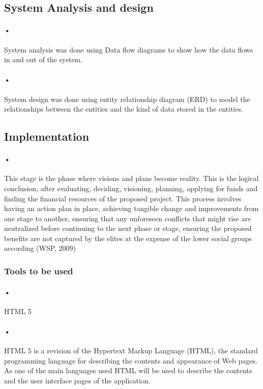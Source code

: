\documentclass[12pt]{article}
\begin{document}
\subsection{System Analysis and design}  
\paragraph{•}System analysis was done using Data flow diagrams to show how the data flows in and out of the system.
\paragraph{•}System design was done using entity relationship diagram (ERD) to model the relationships between the entities and the kind of data stored in the entities. 

\subsection{Implementation}
\paragraph{•}This stage is the phase where visions and plans become reality. This is the logical conclusion, after evaluating, deciding, visioning, planning, applying for funds and finding the financial resources of the proposed project. This process involves having an action plan in place, achieving tangible change and improvements from one stage to another, ensuring that any unforeseen conflicts that might rise are neutralized before continuing to the next phase or stage, ensuring the proposed benefits are not captured by the elites at the expense of the lower social groups according (WSP, 2009)

\subsubsection{Tools to be used}

\paragraph{•}HTML 5
\paragraph{•}HTML 5 is a revision of the Hypertext Markup Language (HTML), the standard programming language for describing the contents and appearance of Web pages. As one of the main languages used HTML will be used to describe the contents and the user interface pages of the application.
\end{document}
